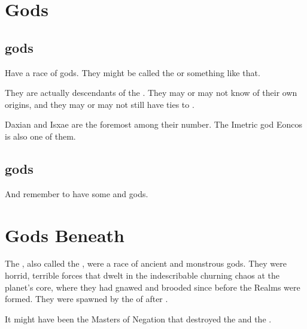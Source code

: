 \section{Gods}









\subsection{\Human{} gods}
Have a race of \human{} gods. 
They might be called the  or something like that. 

They are actually descendants of the \Kezeradi. 
They may or may not know of their own origins, and they may or may not still have ties to \Kezerad. 

Daxian and Isxae are the foremost among their number. 
The Imetric god Eoncos is also one of them. 







\subsection[Scathaese gods]{\Scathaese gods}
And remember to have some \Ortaican{} and \Shurco{} gods. 














\section{Gods Beneath}
The , also called the , were a race of ancient and monstrous gods. 
They were horrid, terrible forces that dwelt in the indescribable churning chaos at the planet's core, where they had gnawed and brooded since before the Realms were formed. 
They were spawned by the  of \Miith after . 

It might have been the Masters of Negation that destroyed the  and the . 









